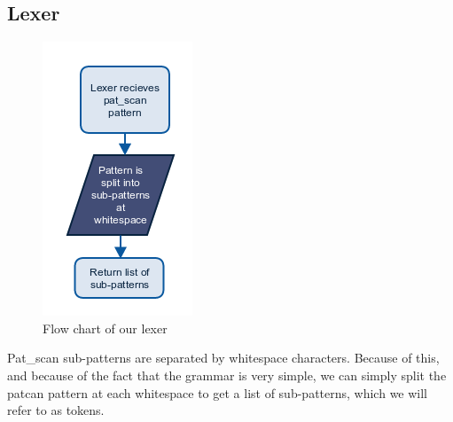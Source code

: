 \documentclass[12pt]{article}
\begin{document}
\subsection{Lexer}
\begin{figure}[H]
	\begin{center}
		\includegraphics[scale=1]{lexer.png}
	\end{center}
	\caption{Flow chart of our lexer}
\end{figure}

Pat\_scan sub-patterns are separated by whitespace characters. Because of this, and because of the fact that the grammar is very simple, we can simply split the patcan pattern at each whitespace to get a list of sub-patterns, which we will refer to as tokens.
\end{document}
